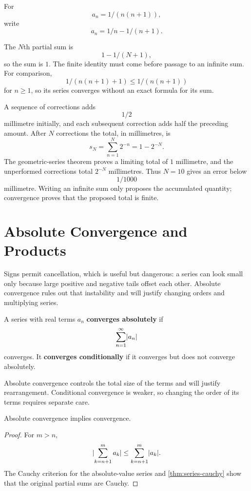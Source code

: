 \begin{example}
For
\[
a_n=1/(n(n+1)),
\]
 write
\[
a_n=1/n-1/(n+1).
\]

The $N$th partial sum is
\[
1-1/(N+1),
\]
 so the sum is $1$.
The finite identity must come before passage to an infinite sum.
For comparison,
\[
1/(n(n+1)+1)\leq1/(n(n+1))
\]
 for $n\geq1$,
so its series converges without an exact formula for its sum.
\end{example}

\begin{example}
A sequence of corrections adds
\[
1/2
\]
 millimetre initially, and each
subsequent correction adds half the preceding amount. After $N$
corrections the total, in millimetres, is
\[
s_N=\sum_{n=1}^N2^{-n}=1-2^{-N}.
\]
The geometric-series theorem proves a limiting total of
$1$ millimetre, and the unperformed corrections total $2^{-N}$
millimetres. Thus $N=10$ gives an error below
\[
1/1000
\]
 millimetre.
Writing an infinite sum only proposes the accumulated quantity;
convergence proves that the proposed total is finite.
\end{example}

\section{Absolute Convergence and Products}

Signs permit cancellation, which is useful but dangerous: a series can look
small only because large positive and negative tails offset each other.
Absolute convergence rules out that instability and will justify changing
orders and multiplying series.

\begin{definition}
A series with real terms $a_n$ \textbf{converges absolutely} if
\[
\sum_{n=1}^{\infty}\lvert a_n\rvert
\]
converges. It \textbf{converges conditionally} if it converges but does not converge absolutely.
\end{definition}

Absolute convergence controls the total size of the terms and will justify rearrangement. Conditional convergence is weaker, so changing the order of its terms requires separate care.

\begin{theorem}
\label{thm:absolute-convergence}
Absolute convergence implies convergence.
\end{theorem}
\begin{proof}
For $m>n$,
\[
\lvert \sum_{k=n+1}^{m}a_k\rvert
\leq
\sum_{k=n+1}^{m}\lvert a_k\rvert.
\]
The Cauchy criterion for the absolute-value series and \cref{thm:series-cauchy} show that the original partial sums are Cauchy.
\end{proof}

